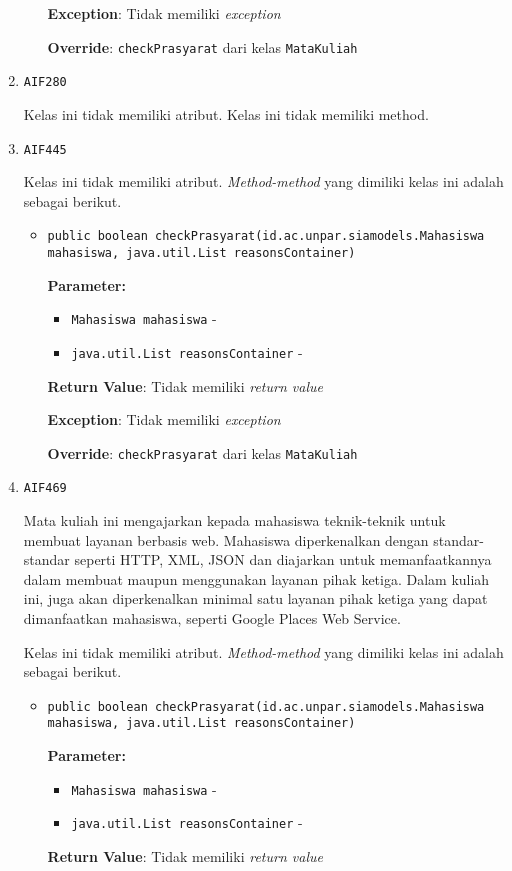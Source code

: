\documentclass{article}
\begin{document}
\begin{enumerate}
\begin{itemize}
\textbf{Exception}: Tidak memiliki \textit{exception}

\textbf{Override}: \texttt{checkPrasyarat} dari kelas \texttt{MataKuliah}

\end{itemize}
\item \texttt{AIF280}



Kelas ini tidak memiliki atribut. Kelas ini tidak memiliki method. \item \texttt{AIF445}



Kelas ini tidak memiliki atribut. \textit{Method-method} yang dimiliki kelas ini adalah sebagai berikut.
\begin{itemize}
\item \texttt{public boolean checkPrasyarat(id.ac.unpar.siamodels.Mahasiswa mahasiswa, java.util.List reasonsContainer)}

\textbf{Parameter:}
\begin{itemize}
\item \texttt{Mahasiswa mahasiswa} - 
\item \texttt{java.util.List reasonsContainer} - 
\end{itemize}
\textbf{Return Value}: Tidak memiliki \textit{return value}

\textbf{Exception}: Tidak memiliki \textit{exception}

\textbf{Override}: \texttt{checkPrasyarat} dari kelas \texttt{MataKuliah}

\end{itemize}
\item \texttt{AIF469}

Mata kuliah ini mengajarkan kepada mahasiswa teknik-teknik untuk membuat 
 layanan berbasis web. Mahasiswa diperkenalkan dengan standar-standar seperti 
 HTTP, XML, JSON dan diajarkan untuk memanfaatkannya dalam membuat maupun 
 menggunakan layanan pihak ketiga. Dalam kuliah ini, juga akan diperkenalkan 
 minimal satu layanan pihak ketiga yang dapat dimanfaatkan mahasiswa, seperti 
 Google Places Web Service.

Kelas ini tidak memiliki atribut. \textit{Method-method} yang dimiliki kelas ini adalah sebagai berikut.
\begin{itemize}
\item \texttt{public boolean checkPrasyarat(id.ac.unpar.siamodels.Mahasiswa mahasiswa, java.util.List reasonsContainer)}

\textbf{Parameter:}
\begin{itemize}
\item \texttt{Mahasiswa mahasiswa} - 
\item \texttt{java.util.List reasonsContainer} - 
\end{itemize}
\textbf{Return Value}: Tidak memiliki \textit{return value}


\end{itemize}
\end{enumerate}
\end{document}
